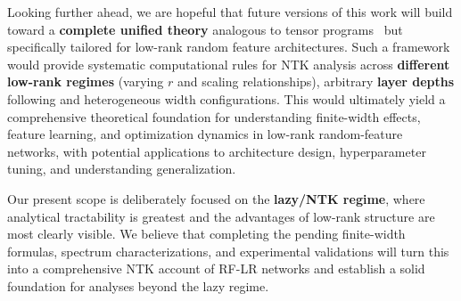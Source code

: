 Looking further ahead, we are hopeful that future versions of this work will build toward a \textbf{complete unified theory} analogous to tensor
 programs~\cite{yang2020tensorprogramsiineural} but specifically tailored for low-rank random feature architectures. Such a framework would provide systematic 
 computational rules for NTK analysis across \textbf{different low-rank regimes} (varying \( r \) and scaling relationships), arbitrary \textbf{layer depths} following \cite{terjék2025mlpseocspectrumntk}
 and heterogeneous width configurations. This would ultimately yield a comprehensive theoretical foundation for understanding finite-width effects, feature learning, and optimization dynamics in low-rank random-feature networks, with potential applications to architecture design, hyperparameter tuning, and understanding generalization.

Our present scope is deliberately focused on the \textbf{lazy/NTK regime}, where analytical tractability is greatest and the advantages of low-rank
 structure are most clearly visible. We believe that completing the pending finite-width formulas, spectrum characterizations, and experimental validations 
 will turn this into a comprehensive NTK account of RF-LR networks and establish a solid foundation for analyses beyond the lazy regime.
